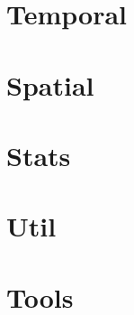 \documentclass[a4paper,titlepage]{book}
\begin{document}
\part{Temporal}


\part{Spatial}






\part{Stats}



\part{Util}











\part{Tools}


\parskip=0mm

\end{document}
